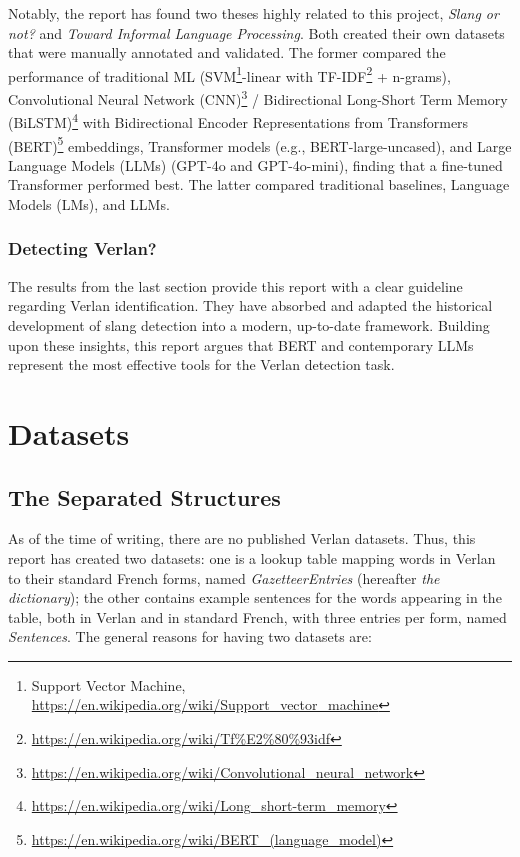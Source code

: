 \documentclass[12pt]{article}
\begin{document}
Notably, the report has found two theses highly related to this project, \textit{Slang or not?} and \textit{Toward Informal Language Processing}\cite{sun2024informal,slangornot2024}. Both created their own datasets that were manually annotated and validated. The former compared the performance of traditional ML (SVM\footnote{Support Vector Machine, \url{https://en.wikipedia.org/wiki/Support_vector_machine}}-linear with TF-IDF\footnote{\url{https://en.wikipedia.org/wiki/Tf\%E2\%80\%93idf}} + n-grams), Convolutional Neural Network (CNN)\footnote{\url{https://en.wikipedia.org/wiki/Convolutional_neural_network}} / Bidirectional Long-Short Term Memory (BiLSTM)\footnote{\url{https://en.wikipedia.org/wiki/Long_short-term_memory}} with Bidirectional Encoder Representations from Transformers (BERT)\footnote{\url{https://en.wikipedia.org/wiki/BERT_(language_model)}} embeddings, Transformer models (e.g., BERT-large-uncased), and Large Language Models (LLMs) (GPT-4o and GPT-4o-mini), finding that a fine-tuned Transformer performed best. The latter compared traditional baselines, Language Models (LMs), and LLMs. 

\subsubsection{Detecting Verlan?}
The results from the last section provide this report with a clear guideline regarding Verlan identification. They have absorbed and adapted the historical development of slang detection into a modern, up-to-date framework. Building upon these insights, this report argues that BERT and contemporary LLMs represent the most effective tools for the Verlan detection task.

\section{Datasets}
\subsection{The Separated Structures}
As of the time of writing, there are no published Verlan datasets. Thus, this report has created two datasets: one is a lookup table mapping words in Verlan to their standard French forms, named \textit{GazetteerEntries} (hereafter \textit{the dictionary}); the other contains example sentences for the words appearing in the table, both in Verlan and in standard French, with three entries per form, named \textit{Sentences}. The general reasons for having two datasets are:
\end{document}
